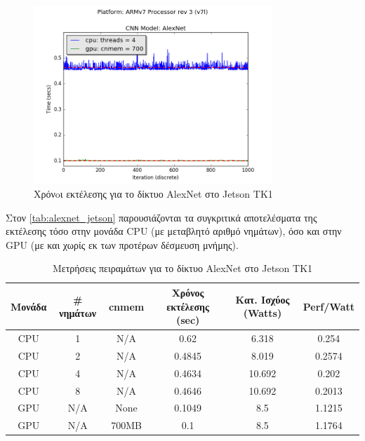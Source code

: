 \begin{figure}[H]
  \centering
  \includegraphics[width=0.8\textwidth]{./images/chapter6/benchmark_alexnet_jetson.png}
  \caption[Χρόνoι εκτέλεσης για το δίκτυο AlexNet στο Jetson TK1]{Χρόνoι εκτέλεσης για το δίκτυο AlexNet στο Jetson TK1}
  \label{fig:alexnet_results_jetson}
\end{figure}

Στον \autoref{tab:alexnet_jetson} παρουσιάζονται τα συγκριτικά αποτελέσματα της
εκτέλεσης τόσο στην μονάδα CPU (με μεταβλητό αριθμό νημάτων), όσο και στην
GPU (με και χωρίς εκ των προτέρων δέσμευση μνήμης).

\begin{table}[H]
  \begin{center}
    \caption{Μετρήσεις πειραμάτων για το δίκτυο AlexNet στο Jetson TK1}
    \label{tab:alexnet_jetson}
    \small
    \begin{tabular}[center]{ | c | c | c | c | c | c | }
      \hline
      \rowcolor{Gray}
      Μονάδα & \# νημάτων & cnmem & Χρόνος εκτέλεσης (sec) & Κατ. Ισχύος (Watts) & Perf/Watt \\
      \hline
      CPU & 1 & N/A & 0.62 & 6.318 & 0.254\\
      CPU & 2 & N/A & 0.4845 & 8.019 & 0.2574\\
      CPU & 4 & N/A & 0.4634 & 10.692 & 0.202\\
      CPU & 8 & N/A & 0.4646 & 10.692 & 0.2013\\
      GPU & N/A & None & 0.1049 & 8.5 & 1.1215\\
      GPU & N/A & 700MB & 0.1 & 8.5 & 1.1764\\
      \hline
    \end{tabular}
  \end{center}
\end{table}



